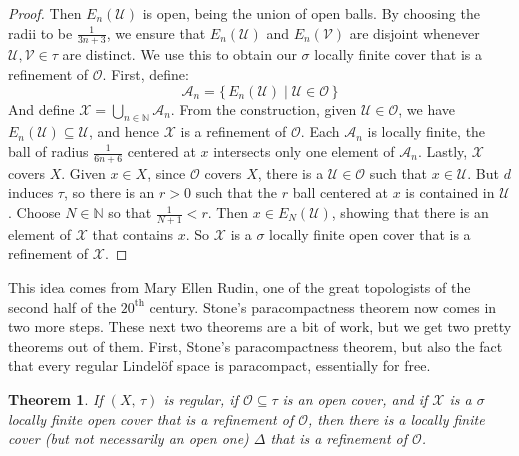\documentclass{article}
\theoremstyle{plain}
\newtheorem{theorem}{Theorem}[section]
\theoremstyle{normal}
\begin{document}
\begin{proof}
            Then $E_{n}(\mathcal{U})$ is open, being the union of open balls.
            By choosing the radii to be $\frac{1}{3n+3}$, we ensure that
            $E_{n}(\mathcal{U})$ and $E_{n}(\mathcal{V})$ are disjoint
            whenever $\mathcal{U},\mathcal{V}\in\tau$ are distinct. We use
            this to obtain our $\sigma$ locally finite cover that is a
            refinement of $\mathcal{O}$. First, define:
            \begin{equation}
                \mathcal{A}_{n}=
                \{\,E_{n}(\mathcal{U})\;|\;\mathcal{U}\in\mathcal{O}\,\}
            \end{equation}
            And define $\mathcal{X}=\bigcup_{n\in\mathbb{N}}\mathcal{A}_{n}$.
            From the construction, given $\mathcal{U}\in\mathcal{O}$, we have
            $E_{n}(\mathcal{U})\subseteq\mathcal{U}$, and hence
            $\mathcal{X}$ is a refinement of $\mathcal{O}$. Each
            $\mathcal{A}_{n}$ is locally finite, the ball of radius
            $\frac{1}{6n+6}$ centered at $x$ intersects only one element of
            $\mathcal{A}_{n}$. Lastly, $\mathcal{X}$ covers $X$. Given
            $x\in{X}$, since $\mathcal{O}$ covers $X$, there is a
            $\mathcal{U}\in\mathcal{O}$ such that $x\in\mathcal{U}$. But
            $d$ induces $\tau$, so there is an $r>0$ such that
            the $r$ ball centered at $x$ is contained in $\mathcal{U}$. Choose
            $N\in\mathbb{N}$ so that $\frac{1}{N+1}<r$. Then
            $x\in{E}_{N}(\mathcal{U})$, showing that there is an element of
            $\mathcal{X}$ that contains $x$. So $\mathcal{X}$ is a
            $\sigma$ locally finite open cover that is a refinement of
            $\mathcal{X}$.
        \end{proof}
        This idea comes from Mary Ellen Rudin, one of the great topologists of
        the second half of the $20^{\textrm{th}}$ century. Stone's
        paracompactness theorem now comes in two more steps. These next two
        theorems are a bit of work, but we get two pretty theorems out of
        them. First, Stone's paracompactness theorem, but also the fact that
        every regular Lindel\"{o}f space is paracompact, essentially for free.
        \begin{theorem}
            If $(X,\,\tau)$ is regular, if $\mathcal{O}\subseteq\tau$ is an
            open cover, and if $\mathcal{X}$ is a $\sigma$ locally finite open
            cover that is a refinement of $\mathcal{O}$, then there is a
            locally finite cover (but not necessarily an open one)
            $\Delta$ that is a refinement of $\mathcal{O}$.
        \end{theorem}
\end{document}
